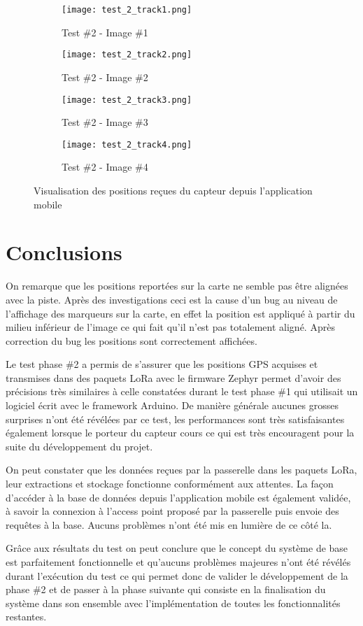 \begin{figure}[htb]
\centering
\begin{subfigure}{.5\textwidth}
  \centering
  \texttt{[image: test\_2\_track1.png]}
  \caption{Test \#2 - Image \#1}
  \label{fig:test_2_track1}
\end{subfigure}%
\begin{subfigure}{.5\textwidth}
  \centering
  \texttt{[image: test\_2\_track2.png]}
  \caption{Test \#2 - Image \#2}
  \label{fig:test_2_track2}
\end{subfigure}
\begin{subfigure}{.5\textwidth}
  \centering
  \texttt{[image: test\_2\_track3.png]}
  \caption{Test \#2 - Image \#3}
  \label{fig:test_2_track3}
\end{subfigure}%
\begin{subfigure}{.5\textwidth}
  \centering
  \texttt{[image: test\_2\_track4.png]}
  \caption{Test \#2 - Image \#4}
  \label{fig:test_2_track4}
\end{subfigure}
\caption{Visualisation des positions reçues du capteur depuis l'application mobile}
\label{fig:test_2}
\end{figure}

\section{Conclusions}

On remarque que les positions reportées sur la carte ne semble pas être alignées avec la piste. Après des investigations ceci est la cause d'un bug au niveau de l'affichage des marqueurs sur la carte, en effet la position est appliqué à partir du milieu inférieur de l'image ce qui fait qu'il n'est pas totalement aligné. Après correction du bug les positions sont correctement affichées.

Le test phase \#2 a permis de s'assurer que les positions GPS acquises et transmises dans des paquets LoRa avec le firmware Zephyr permet d'avoir des précisions très similaires à celle constatées durant le test phase \#1 qui utilisait un logiciel écrit avec le framework Arduino. De manière générale aucunes grosses surprises n'ont été révélées par ce test, les performances sont très satisfaisantes également lorsque le porteur du capteur cours ce qui est très encouragent pour la suite du développement du projet.

On peut constater que les données reçues par la passerelle dans les paquets LoRa, leur extractions et stockage fonctionne conformément aux attentes. La façon d'accéder à la base de données depuis l'application mobile est également validée, à savoir la connexion à l'access point proposé par la passerelle puis envoie des requêtes à la base. Aucuns problèmes n'ont été mis en lumière de ce côté la.

Grâce aux résultats du test on peut conclure que le concept du système de base est parfaitement fonctionnelle et qu'aucuns problèmes majeures n'ont été révélés durant l'exécution du test ce qui permet donc de valider le développement de la phase \#2 et de passer à la phase suivante qui consiste en la finalisation du système dans son ensemble avec l'implémentation de toutes les fonctionnalités restantes.
